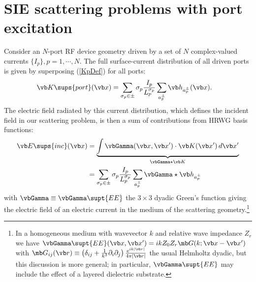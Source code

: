 \documentclass[letterpaper]{article}
\begin{document}
\newpage

\section{SIE scattering problems with port excitation}
\label{SIEWithPortExcitationSection}

Consider an $N$-port RF device geometry driven by a set of 
$N$ complex-valued currents $\{I_p\}, p=1,\cdots,N.$
The full surface-current distribution of all driven ports
is given by superposing (\ref{KpDef}) for all ports:
\begin{align*}
 \vb K\sups{port}(\vb x)
&= \sum_{\sigma_p \in\pm} \sigma_p \frac{I_p}{L_p^{\sigma_p}} 
   \sum_{a_p^\pm} \vb h_{a_p^\pm}(\vb x).
\end{align*}
The electric field radiated by this current distribution, which defines
the incident field in our scattering problem, is then a sum of
contributions from HRWG basis functions:
\begin{align}
  \vb E\sups{inc}(\vb x)
&=\underbrace{\int \vbGamma(\vb x, \vb x^\prime) \cdot \vb K(\vb x^\prime) \, d\vb x^\prime
             }_{\vbGamma\star \vb K}
\\
&= \sum_{\sigma_p \in\pm} \sigma_p \frac{I_p}{L_p^{\sigma_p}}
   \sum_{a_p^\pm} \vbGamma \star \vb h_{a_p^\pm}
\label{EInc}
\end{align}
with $\vbGamma\equiv \vbGamma\supt{EE}$ the $3\times 3$ dyadic Green's function
giving the electric field of an electric current in the medium
of the scattering geometry.\footnote{In a homogeneous
medium with wavevector $k$ and relative wave impedance $Z_r$ we have
$\vbGamma\supt{EE}(\vb x, \vb x^\prime)=ik Z_0 Z_r \mb G(k; \vb x-\vb x^\prime)$
with 
$\mb G_{ij}(\vb r) \equiv \left(\delta_{ij} + \frac{1}{k^2}\partial_i \partial_j\right)
 \frac{e^{ik|\vb r|}}{4\pi |\vb r|}$ the usual Helmholtz dyadic, 
but this discussion is more general; in particular, $\vbGamma\supt{EE}$ may
include the effect of a layered dielectric substrate.}
\end{document}
